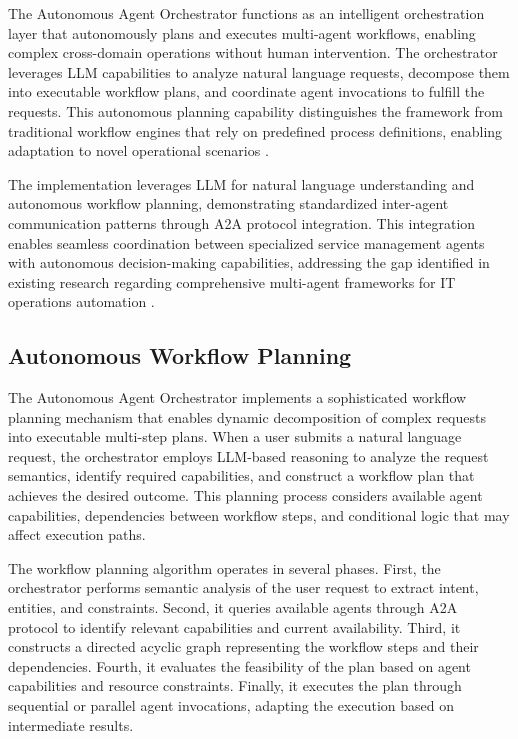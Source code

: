 \documentclass{article}
\begin{document}
The Autonomous Agent Orchestrator functions as an intelligent orchestration layer that autonomously plans and executes multi-agent workflows, enabling complex cross-domain operations without human intervention. The orchestrator leverages LLM capabilities to analyze natural language requests, decompose them into executable workflow plans, and coordinate agent invocations to fulfill the requests. This autonomous planning capability distinguishes the framework from traditional workflow engines that rely on predefined process definitions, enabling adaptation to novel operational scenarios \cite{langchain2024}.

The implementation leverages LLM for natural language understanding and autonomous workflow planning, demonstrating standardized inter-agent communication patterns through A2A protocol integration. This integration enables seamless coordination between specialized service management agents with autonomous decision-making capabilities, addressing the gap identified in existing research regarding comprehensive multi-agent frameworks for IT operations automation \cite{shetty2024}.

\subsection{Autonomous Workflow Planning}

The Autonomous Agent Orchestrator implements a sophisticated workflow planning mechanism that enables dynamic decomposition of complex requests into executable multi-step plans. When a user submits a natural language request, the orchestrator employs LLM-based reasoning to analyze the request semantics, identify required capabilities, and construct a workflow plan that achieves the desired outcome. This planning process considers available agent capabilities, dependencies between workflow steps, and conditional logic that may affect execution paths.

The workflow planning algorithm operates in several phases. First, the orchestrator performs semantic analysis of the user request to extract intent, entities, and constraints. Second, it queries available agents through A2A protocol to identify relevant capabilities and current availability. Third, it constructs a directed acyclic graph representing the workflow steps and their dependencies. Fourth, it evaluates the feasibility of the plan based on agent capabilities and resource constraints. Finally, it executes the plan through sequential or parallel agent invocations, adapting the execution based on intermediate results.
\end{document}

